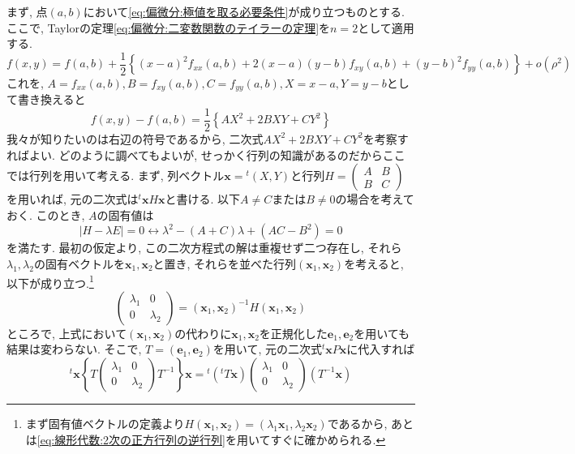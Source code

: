 \documentclass[a4j,dvipdfmx]{jsarticle}
\numberwithin{equation}{section}
\begin{document}
            まず, 点$(a,b)$において\eqref{eq:偏微分:極値を取る必要条件}が成り立つものとする. ここで, Taylorの定理\eqref{eq:偏微分:二変数関数のテイラーの定理}を$n=2$として適用する.
            \begin{equation*}
                f(x,y)=f(a,b)+\frac{1}{2}\left\{(x-a)^2f_{xx}(a,b)+2(x-a)(y-b)f_{xy}(a,b)+(y-b)^2f_{yy}(a,b)\right\}+o(\rho^2)
            \end{equation*}
            これを, $A=f_{xx}(a,b),B=f_{xy}(a,b),C=f_{yy}(a,b),X=x-a,Y=y-b$として書き換えると
            \begin{equation*}
                f(x,y)-f(a,b)=\frac{1}{2}\left\{AX^2+2BXY+CY^2\right\}
            \end{equation*}
            我々が知りたいのは右辺の符号であるから, 二次式$AX^2+2BXY+CY^2$を考察すればよい. どのように調べてもよいが, せっかく行列の知識があるのだからここでは行列を用いて考える.
            まず, 列ベクトル$\bm{x}={}^t\!(X,Y)$と行列$H=\begin{pmatrix}A & B \\ B & C\end{pmatrix}$を用いれば, 元の二次式は${}^t\!\bm{x}H\bm{x}$と書ける. 
            以下$A\neq C$または$B\neq0$の場合を考えておく. このとき, $A$の固有値は
            \begin{equation*}
                |H-\lambda E|=0 \leftrightarrow \lambda^2- (A+C)\lambda + (AC-B^2)=0
            \end{equation*}
            を満たす. 最初の仮定より, この二次方程式の解は重複せず二つ存在し, それら$\lambda_1,\lambda_2$の固有ベクトルを$\bm{x}_1,\bm{x}_2$と置き, それらを並べた行列$(\bm{x}_1,\bm{x}_2)$を考えると, 以下が成り立つ.\footnote{まず固有値ベクトルの定義より$H(\bm{x}_1,\bm{x}_2)=(\lambda_1\bm{x}_1,\lambda_2\bm{x}_2)$であるから, あとは\eqref{eq:線形代数:2次の正方行列の逆行列}を用いてすぐに確かめられる.}
            \begin{equation*}
                \begin{pmatrix}\lambda_1 & 0 \\0 & \lambda_2\end{pmatrix}=(\bm{x}_1,\bm{x}_2)^{-1}H(\bm{x}_1,\bm{x}_2)
            \end{equation*}
            ところで, 上式において$(\bm{x}_1,\bm{x}_2)$の代わりに$\bm{x}_1,\bm{x}_2$を正規化した$\bm{e}_1,\bm{e}_2$を用いても結果は変わらない.
            そこで, $T=(\bm{e}_1,\bm{e}_2)$を用いて, 元の二次式${}^t\!\bm{x}P\bm{x}$に代入すれば
            \begin{equation*}
                {}^t\!\bm{x}\left\{T\begin{pmatrix}\lambda_1 & 0 \\ 0 & \lambda_2\end{pmatrix}T^{-1}\right\}\bm{x}={}^t\!({}^t\!T\bm{x})\begin{pmatrix}\lambda_1 & 0 \\ 0 & \lambda_2\end{pmatrix}(T^{-1}\bm{x})
            \end{equation*}
\end{document}
